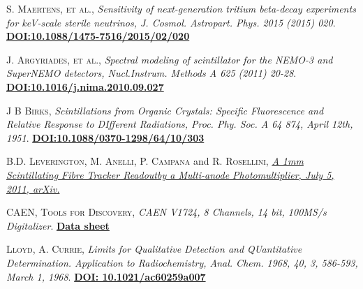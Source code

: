 \begin{thebibliography}{100}
 \textsc{S. Maertens}, \textsc{et al.},  \textit{Sensitivity of next-generation tritium beta-decay experiments for keV-scale sterile neutrinos, J. Cosmol. Astropart. Phys. 2015 (2015) 020}. \href{https://iopscience.iop.org/article/10.1088/1475-7516/2015/02/020}\textbf{DOI:10.1088/1475-7516/2015/02/020}

 \textsc{J. Argyriades}, \textsc{et al.},
\textit{Spectral modeling of scintillator for the NEMO-3 and SuperNEMO detectors, Nucl.Instrum. Methods A 625 (2011) 20-28}. \href{https://doi.org/10.1016/j.nima.2010.09.027}{\textbf{DOI:10.1016/j.nima.2010.09.027}}

 \textsc{J B Birks},
\textit{Scintillations from Organic Crystals: Specific Fluorescence and Relative Response to DIfferent Radiations, Proc. Phy. Soc. A 64 874, April 12th, 1951}. \href{https://doi.org/10.1088/0370-1298/64/10/303}{\textbf{DOI:10.1088/0370-1298/64/10/303}}

 \textsc{B.D. Leverington}, \textsc{M. Anelli}, \textsc{P. Campana} and \textsc{R. Rosellini},
\href{https://arxiv.org/abs/1106.5649}{\textit{A 1mm Scintillating Fibre Tracker Readoutby a Multi-anode Photomultiplier, July 5, 2011, arXiv.}}

 \textsc{CAEN, Tools for Discovery},
\textit{CAEN V1724, 8 Channels, 14 bit, 100MS/s Digitalizer}. \href{https://www.caen.it/products/v1724/}{\textbf{Data sheet}}

 \textsc{Lloyd, A. Currie},
\textit{Limits for Qualitative Detection and QUantitative Determination. Application to Radiochemistry, Anal. Chem. 1968, 40, 3, 586-593, March 1, 1968}. \href{https://doi.org/10.1021/ac60259a007}{\textbf{DOI: 10.1021/ac60259a007}}


\end{thebibliography}